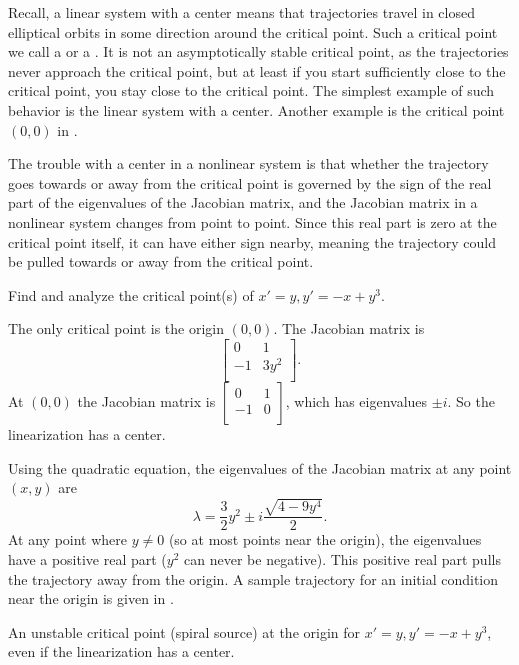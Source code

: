 \documentclass{ximera}
\begin{document}
Recall, a linear system with a center means that trajectories travel in closed elliptical orbits in some direction around the critical point.  Such a critical point we call a \emph{} or a \emph{}.  It is not an asymptotically stable critical point, as the trajectories never approach the critical point, but at least if you start sufficiently close to the critical point, you stay close to the critical point.  The simplest example of such behavior is the linear system with a center.  Another example is the critical point $(0,0)$ in .

The trouble with a center in a nonlinear system is that whether the trajectory goes towards or away from the critical point is governed by the sign of the real part of the eigenvalues of the Jacobian matrix, and the Jacobian matrix in a nonlinear system changes from point to point.  Since this real part is zero at the critical point itself, it can have either sign nearby, meaning the trajectory could be pulled towards or away from the critical point.

\begin{example}
    Find and analyze the critical point(s) of $x'=y, y' = -x+y^3$.  
\end{example}

\begin{exampleSol}
    The only critical point is the origin $(0,0)$.  The Jacobian matrix is 
    \begin{equation*}
        \begin{bmatrix}
            0 & 1 \\
            -1 & 3 y^2 \\
        \end{bmatrix} .
    \end{equation*}
    At $(0,0)$ the Jacobian matrix is
    $\left[ \begin{smallmatrix}
        0 & 1 \\
        -1 & 0 \\
    \end{smallmatrix} \right]$, 
    which has eigenvalues $\pm i$.  So the linearization has a center.
    
    Using the quadratic equation, the eigenvalues of the Jacobian matrix at any point $(x,y)$ are
    \begin{equation*}
        \lambda = \frac{3}{2}y^2 \pm i \frac{\sqrt{4-9y^4}}{2} .
    \end{equation*}
    At any point where $y \not= 0$ (so at most points near the origin), the eigenvalues have a positive real part ($y^2$ can never be negative).  This positive real part pulls the trajectory away from the origin.  A sample trajectory for an initial condition near the origin is given in .
    \begin{myfig}
        \capstart
        \caption{An unstable critical point (spiral source) at the origin for $x'=y, y' = -x+y^3$, even if the linearization has a center.  \label{fig:nlin-unstable-center}}
    \end{myfig}
\end{exampleSol}
\end{document}
